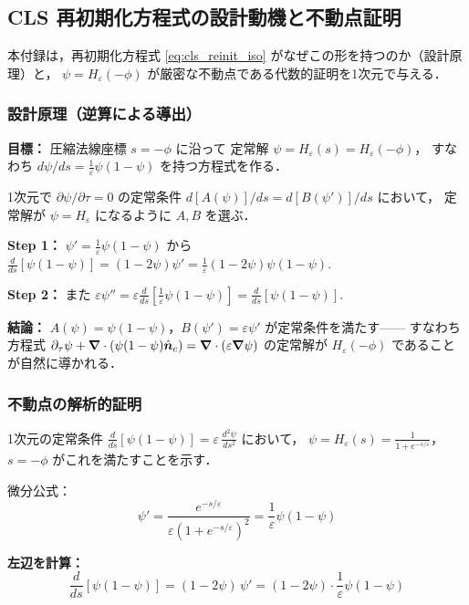 \subsection{CLS 再初期化方程式の設計動機と不動点証明}
\label{app:cls_fixed_point}

本付録は，再初期化方程式 \eqref{eq:cls_reinit_iso} がなぜこの形を持つのか（設計原理）と，
$\psi = H_\varepsilon(-\phi)$ が厳密な不動点である代数的証明を1次元で与える．

\subsubsection*{設計原理（逆算による導出）}

\textbf{目標：} 圧縮法線座標 $s=-\phi$ に沿って
定常解 $\psi = H_\varepsilon(s)=H_\varepsilon(-\phi)$，
すなわち $d\psi/ds = \frac{1}{\varepsilon}\psi(1-\psi)$ を持つ方程式を作る．

1次元で $\partial\psi/\partial\tau = 0$ の定常条件 $d[A(\psi)]/ds = d[B(\psi')]/ds$ において，
定常解が $\psi = H_\varepsilon$ になるように $A,B$ を選ぶ．

\textbf{Step 1：} $\psi' = \frac{1}{\varepsilon}\psi(1-\psi)$ から
$\frac{d}{ds}[\psi(1-\psi)] = (1-2\psi)\psi' = \frac{1}{\varepsilon}(1-2\psi)\psi(1-\psi)$.

\textbf{Step 2：} また $\varepsilon\psi'' = \varepsilon\frac{d}{ds}[\frac{1}{\varepsilon}\psi(1-\psi)] = \frac{d}{ds}[\psi(1-\psi)]$.

\textbf{結論：} $A(\psi) = \psi(1-\psi)$，$B(\psi') = \varepsilon\psi'$ が定常条件を満たす——
すなわち方程式
$\partial_\tau\psi + \bm{\nabla}\cdot(\psi(1-\psi)\hat{\bm{n}}_c) = \bm{\nabla}\cdot(\varepsilon\bm{\nabla}\psi)$
の定常解が $H_\varepsilon(-\phi)$ であることが自然に導かれる．

\subsubsection*{不動点の解析的証明}

1次元の定常条件 $\frac{d}{ds}[\psi(1-\psi)] = \varepsilon\,\frac{d^2\psi}{ds^2}$ において，
$\psi = H_\varepsilon(s) = \frac{1}{1+e^{-s/\varepsilon}}$，
$s=-\phi$ がこれを満たすことを示す．

微分公式：
\[
  \psi' = \frac{e^{-s/\varepsilon}}{\varepsilon(1+e^{-s/\varepsilon})^2} = \frac{1}{\varepsilon}\psi(1-\psi)
\]

\textbf{左辺を計算：}
\[
  \frac{d}{ds}[\psi(1-\psi)]
  = (1-2\psi)\,\psi'
  = (1-2\psi)\cdot\frac{1}{\varepsilon}\psi(1-\psi)
\]

